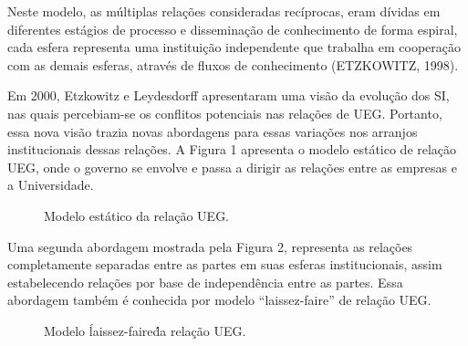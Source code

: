 Neste modelo, as múltiplas relações consideradas recíprocas, eram dívidas em diferentes estágios de processo e disseminação de conhecimento de forma espiral, cada esfera representa uma instituição independente que trabalha em cooperação com as demais esferas, através de fluxos de conhecimento (ETZKOWITZ, 1998).

Em 2000, Etzkowitz e Leydesdorff apresentaram uma visão da evolução dos SI, nas quais percebiam-se os conflitos potenciais nas relações de UEG. Portanto, essa nova visão trazia novas abordagens para essas variações nos arranjos institucionais dessas relações. A Figura 1 apresenta o modelo estático de relação UEG, onde o governo se envolve e passa a dirigir as relações entre as empresas e a Universidade.


\begin{figure}[ht]
    \centering
    \caption{Modelo estático da relação UEG.}
    \label{crescimento_odf}
\end{figure}

Uma segunda abordagem mostrada pela Figura 2, representa as relações completamente separadas entre as partes em suas esferas institucionais, assim estabelecendo relações por base de independência entre as partes. Essa abordagem também é conhecida por modelo “laissez-faire” de relação UEG.


\begin{figure}[ht]
    \centering
    \caption{Modelo \'laissez-faire\' da relação UEG.}
    \label{crescimento_odf}
\end{figure}

